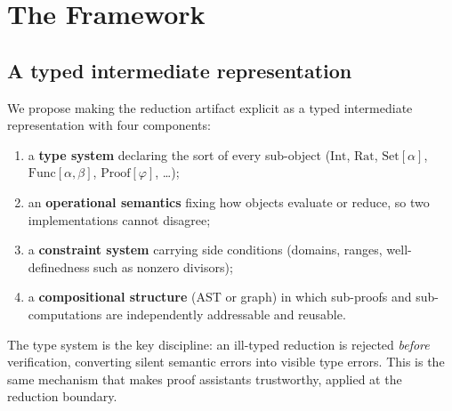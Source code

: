 \documentclass[11pt,a4paper]{article}
\theoremstyle{plain}
\theoremstyle{definition}
\theoremstyle{remark}
\begin{document}
\section{The Framework}\label{sec:framework}

\subsection{A typed intermediate representation}
We propose making the reduction artifact explicit as a typed intermediate
representation with four components:
\begin{enumerate}[leftmargin=2em,itemsep=2pt,topsep=3pt]
\item a \textbf{type system} declaring the sort of every sub-object
($\mathrm{Int}$, $\mathrm{Rat}$, $\mathrm{Set}[\alpha]$,
$\mathrm{Func}[\alpha,\beta]$, $\mathrm{Proof}[\varphi]$, \dots);
\item an \textbf{operational semantics} fixing how objects evaluate or
reduce, so two implementations cannot disagree;
\item a \textbf{constraint system} carrying side conditions (domains,
ranges, well-definedness such as nonzero divisors);
\item a \textbf{compositional structure} (AST or graph) in which sub-proofs
and sub-computations are independently addressable and reusable.
\end{enumerate}
The type system is the key discipline: an ill-typed reduction is rejected
\emph{before} verification, converting silent semantic errors into visible
type errors. This is the same mechanism that makes proof assistants
trustworthy, applied at the reduction boundary.
\end{document}

